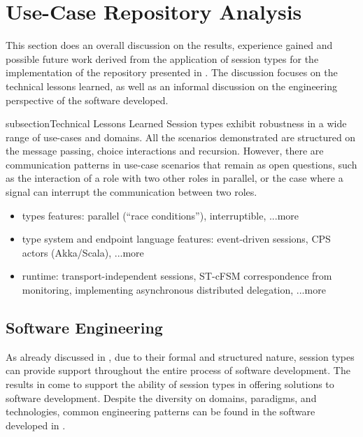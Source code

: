 \section{Use-Case Repository Analysis}
\label{sec:session_engineeering}


This section does an overall discussion on the
results, experience gained and possible future work
derived from the application
of session types for the implementation of the
repository presented in .
The discussion focuses on the technical lessons
learned, as well as an informal discussion
on the engineering perspective of the software
developed.

subsection{Technical Lessons Learned}
Session types exhibit robustness in a wide range of
use-cases and domains. All the scenarios demonstrated
are structured on the message passing,
choice interactions and recursion. 
However, there are communication patterns 
in use-case scenarios that remain as open
questions, such as the interaction of a role with two
other roles in parallel, or the case where a signal
can interrupt the communication between two roles.


\begin{itemize}
	\item
	types features: parallel (``race conditions''), interruptible, ...more
	
	\item
	type system and endpoint language features: event-driven sessions, CPS actors (Akka/Scala), ...more
	
	\item
	runtime: transport-independent sessions, ST-cFSM correspondence from monitoring, implementing asynchronous distributed delegation, ...more
\end{itemize}


\subsection{Software Engineering}
As already discussed in ,
due to their formal and structured nature,
session types can provide support throughout the
entire process of software development.
The results in  come to support
the ability of session types in offering solutions
to software development.
%
Despite the diversity on domains, paradigms,
and technologies, common engineering patterns
can be found in the software developed in .

